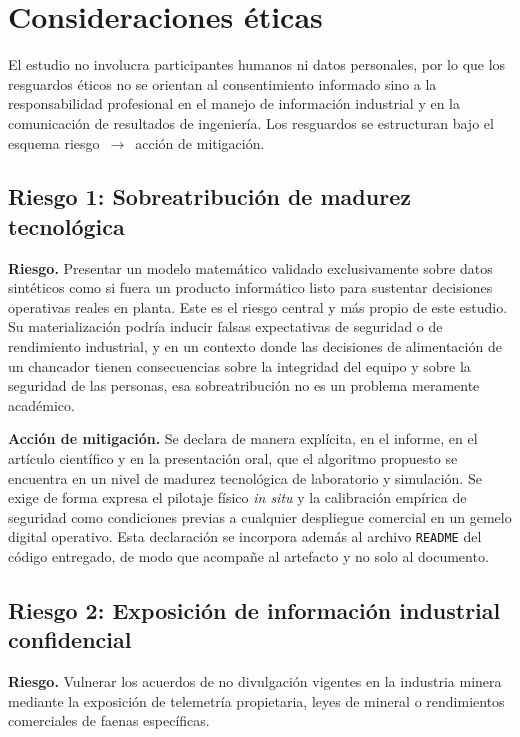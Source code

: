 \section{Consideraciones éticas}
\label{sec:etica}

El estudio no involucra participantes humanos ni datos personales, por lo que
los resguardos éticos no se orientan al consentimiento informado sino a la
responsabilidad profesional en el manejo de información industrial y en la
comunicación de resultados de ingeniería. Los resguardos se estructuran bajo el
esquema riesgo~$\rightarrow$~acción de mitigación.

\subsection{Riesgo 1: Sobreatribución de madurez tecnológica}

\textbf{Riesgo.} Presentar un modelo matemático validado exclusivamente sobre
datos sintéticos como si fuera un producto informático listo para sustentar
decisiones operativas reales en planta. Este es el riesgo central y más propio
de este estudio. Su materialización podría inducir falsas expectativas de
seguridad o de rendimiento industrial, y en un contexto donde las decisiones de
alimentación de un chancador tienen consecuencias sobre la integridad del equipo
y sobre la seguridad de las personas, esa sobreatribución no es un problema
meramente académico.

\textbf{Acción de mitigación.} Se declara de manera explícita, en el informe, en
el artículo científico y en la presentación oral, que el algoritmo propuesto se
encuentra en un nivel de madurez tecnológica de laboratorio y simulación. Se
exige de forma expresa el pilotaje físico \emph{in situ} y la calibración
empírica de seguridad como condiciones previas a cualquier despliegue comercial
en un gemelo digital operativo. Esta declaración se incorpora además al archivo
\texttt{README} del código entregado, de modo que acompañe al artefacto y no
solo al documento.

\subsection{Riesgo 2: Exposición de información industrial confidencial}

\textbf{Riesgo.} Vulnerar los acuerdos de no divulgación vigentes en la
industria minera mediante la exposición de telemetría propietaria, leyes de
mineral o rendimientos comerciales de faenas específicas.

